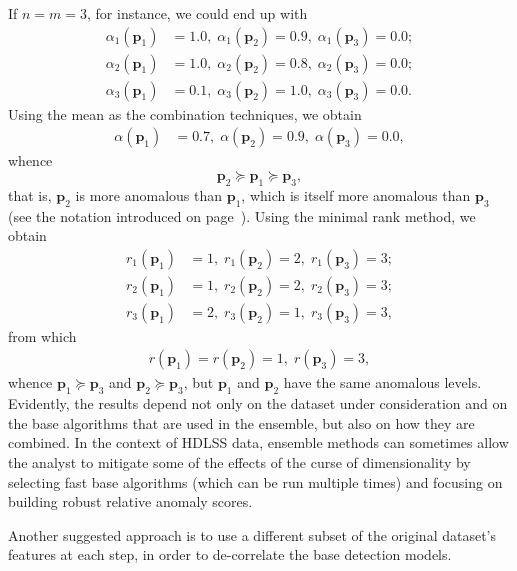 If $n=m=3$, for instance, we could end up with 
\begin{align*}\alpha_{1}\left(\mathbf{p}_{1}\right)&=1.0,\; \alpha_{1}\left(\mathbf{p}_{2}\right)=0.9,\; \alpha_{1}\left(\mathbf{p}_{3}\right)=0.0; \\ 
\alpha_{2}\left(\mathbf{p}_{1}\right)&=1.0,\; \alpha_{2}\left(\mathbf{p}_{2}\right)=0.8,\; \alpha_{2}\left(\mathbf{p}_{3}\right)=0.0;\\
\alpha_{3}\left(\mathbf{p}_{1}\right)&=0.1,\;  \alpha_{3}\left(\mathbf{p}_{2}\right)=1.0,\; \alpha_{3}\left(\mathbf{p}_{3}\right)=0.0.
\end{align*}
Using the mean as the combination techniques, we obtain
\begin{align*}
\alpha\left(\mathbf{p}_{1}\right)&=0.7,\; \alpha\left(\mathbf{p}_{2}\right)=0.9,\; \alpha\left(\mathbf{p}_{3}\right)=0.0,
\end{align*}
whence $$\mathbf{p}_2\succeq \mathbf{p}_1\succeq \mathbf{p}_3,$$ that is, $\mathbf{p}_2$ is more anomalous than $\mathbf{p}_1$, which is itself more anomalous than  $\mathbf{p}_3$ (see the notation introduced on page~\pageref{succeq}). 
\newl 
Using the minimal rank method, we obtain 
\begin{align*}
r_{1}\left(\mathbf{p}_{1}\right)&=1,\; r_{1}\left(\mathbf{p}_{2}\right)=2,\; r_{1}\left(\mathbf{p}_{3}\right)=3;\\ 
r_{2}\left(\mathbf{p}_{1}\right)&=1,\; r_{2}\left(\mathbf{p}_{2}\right)=2,\; r_{2}\left(\mathbf{p}_{3}\right)=3;\\
r_{3}\left(\mathbf{p}_{1}\right)&=2,\; r_{3}\left(\mathbf{p}_{2}\right)=1,\; r_{3}\left(\mathbf{p}_{3}\right)=3,
\end{align*}
from which 
\begin{align*}
r\left(\mathbf{p}_{1}\right)=r\left(\mathbf{p}_{2}\right)=1,\; r \left(\mathbf{p}_{3}\right)=3, 
\end{align*}
whence $\mathbf{p}_1\succeq \mathbf{p}_3$ and $\mathbf{p}_2\succeq \mathbf{p}_3$, but $\mathbf{p}_1$ and  $\mathbf{p}_2$ have the same anomalous levels. 
\newl Evidently, the results depend not only on the dataset under consideration and on the base algorithms that are used in the ensemble, but also on how they are combined. 
\newl In the context of HDLSS data, ensemble methods can sometimes allow the analyst to mitigate some of the effects of the curse of dimensionality by selecting fast base algorithms (which can be run multiple times) and focusing on building robust relative anomaly scores. \par Another suggested  approach is to use a different subset of the original dataset's features at each step, in order to de-correlate the base detection models. 
%
%


